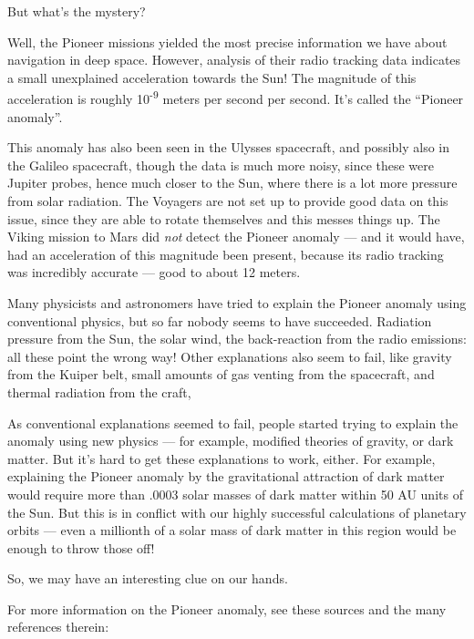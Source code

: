 \documentclass{article}
\renewcommand{\texttt}[1]{%
  \begingroup
  \ttfamily
  \begingroup\lccode`~=`/\lowercase{\endgroup\def~}{/\discretionary{}{}{}}%
  \begingroup\lccode`~=`[\lowercase{\endgroup\def~}{[\discretionary{}{}{}}%
  \begingroup\lccode`~=`.\lowercase{\endgroup\def~}{.\discretionary{}{}{}}%
  \catcode`/=\active\catcode`[=\active\catcode`.=\active
  \scantokens{#1\noexpand}%
  \endgroup
}
\begin{document}
But what's the mystery?

Well, the Pioneer missions yielded the most precise information we have
about navigation in deep space. However, analysis of their radio
tracking data indicates a small unexplained acceleration towards the
Sun! The magnitude of this acceleration is roughly
10\textsuperscript{-9} meters per second per second. It's called the
``Pioneer anomaly''.

This anomaly has also been seen in the Ulysses spacecraft, and possibly
also in the Galileo spacecraft, though the data is much more noisy,
since these were Jupiter probes, hence much closer to the Sun, where
there is a lot more pressure from solar radiation. The Voyagers are not
set up to provide good data on this issue, since they are able to rotate
themselves and this messes things up. The Viking mission to Mars did
\emph{not} detect the Pioneer anomaly --- and it would have, had an
acceleration of this magnitude been present, because its radio tracking
was incredibly accurate --- good to about 12 meters.

Many physicists and astronomers have tried to explain the Pioneer
anomaly using conventional physics, but so far nobody seems to have
succeeded. Radiation pressure from the Sun, the solar wind, the
back-reaction from the radio emissions: all these point the wrong way!
Other explanations also seem to fail, like gravity from the Kuiper belt,
small amounts of gas venting from the spacecraft, and thermal radiation
from the craft,

As conventional explanations seemed to fail, people started trying to
explain the anomaly using new physics --- for example, modified theories
of gravity, or dark matter. But it's hard to get these explanations to
work, either. For example, explaining the Pioneer anomaly by the
gravitational attraction of dark matter would require more than .0003
solar masses of dark matter within 50 AU units of the Sun. But this is
in conflict with our highly successful calculations of planetary orbits
--- even a millionth of a solar mass of dark matter in this region would
be enough to throw those off!

So, we may have an interesting clue on our hands.

For more information on the Pioneer anomaly, see these sources and the
many references therein:

\end{document}
